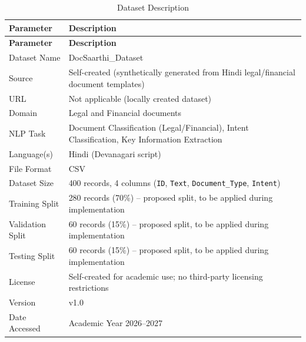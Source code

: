 \begin{longtable}{|p{5cm}|p{10cm}|}
\caption{Dataset Description}
\label{tab:datasetdescription}\\

\hline
\textbf{Parameter} & \textbf{Description} \\
\hline
\endfirsthead

\hline
\textbf{Parameter} & \textbf{Description} \\
\hline
\endhead

Dataset Name &
DocSaarthi\_Dataset
\\ \hline

Source &
Self-created (synthetically generated from Hindi legal/financial document templates)
\\ \hline

URL &
Not applicable (locally created dataset)
\\ \hline

Domain &
Legal and Financial documents
\\ \hline

NLP Task &
Document Classification (Legal/Financial), Intent Classification, Key Information Extraction
\\ \hline

Language(s) &
Hindi (Devanagari script)
\\ \hline

File Format &
CSV
\\ \hline

Dataset Size &
400 records, 4 columns (\texttt{ID}, \texttt{Text}, \texttt{Document\_Type}, \texttt{Intent})
\\ \hline

Training Split &
280 records (70\%) -- proposed split, to be applied during implementation
\\ \hline

Validation Split &
60 records (15\%) -- proposed split, to be applied during implementation
\\ \hline

Testing Split &
60 records (15\%) -- proposed split, to be applied during implementation
\\ \hline

License &
Self-created for academic use; no third-party licensing restrictions
\\ \hline

Version &
v1.0
\\ \hline

Date Accessed &
Academic Year 2026--2027
\\ \hline

\end{longtable}

